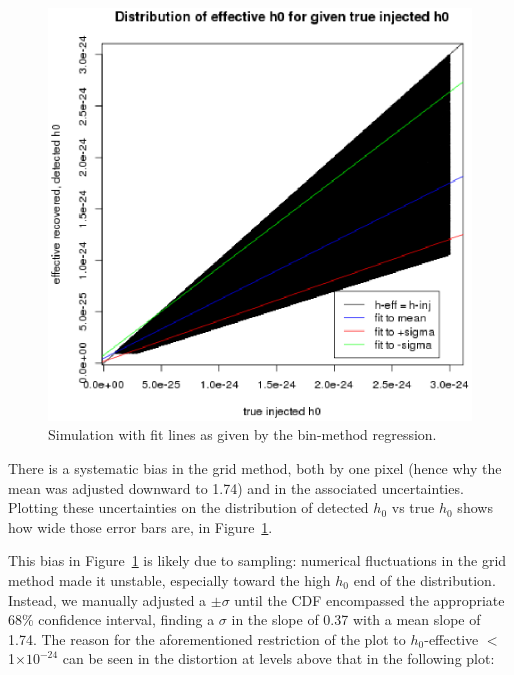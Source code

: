 \begin{figure}
\begin{center}
\includegraphics[width=0.5\paperwidth,height=0.35\paperheight]{PlotHEffVsH0TrueWithLines.eps}
\caption{Simulation with fit lines as given by the bin-method regression.
\label{fig:plotheffvsh0truewithlines}}
\end{center}
\end{figure}

There is a systematic bias in the grid method, both by one pixel (hence why the mean was adjusted downward to 1.74) and in the associated uncertainties. Plotting these uncertainties on the distribution of {detected $h_0$} vs {true $h_0$} shows how wide those error bars are, in Figure~\ref{fig:plotheffvsh0truewithlines}.


This bias in Figure~\ref{fig:plotheffvsh0truewithlines} is likely due to sampling: numerical fluctuations in the grid method made it unstable,
especially toward the high $h_0$ end of the distribution. Instead, we manually adjusted a $\pm \sigma$ until the CDF encompassed the appropriate 68\% confidence interval, finding a $\sigma$ in the slope of 0.37 with a mean slope of 1.74. The reason for the aforementioned restriction of the plot to $h_0$-effective $<$ 1$\times 10^{-24}$ can be seen in the distortion at levels above that in the following plot:

